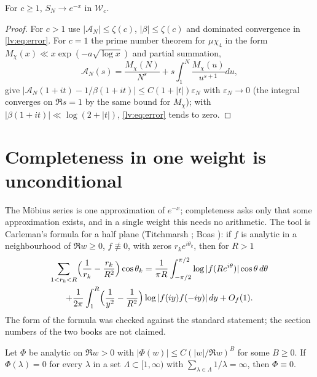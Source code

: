 \begin{theorem}\label{lv:thm:c1}
For $c\ge1$, $S_N\to e^{-x}$ in $\mathcal W_c$.
\end{theorem}

\begin{proof}
For $c>1$ use $|\mathcal A_N|\le\zeta(c)$, $|\beta|\le\zeta(c)$ and dominated convergence in \eqref{lv:eq:error}. For $c=1$ the prime number theorem for $\mu\chi_4$ in the form $M_\chi(x)\ll x\exp(-a\sqrt{\log x})$ and partial summation,
\begin{equation}\label{lv:eq:ps}
\mathcal A_N(s)=\frac{M_\chi(N)}{N^s}+s\int_1^N\frac{M_\chi(u)}{u^{s+1}}du,
\end{equation}
give $|\mathcal A_N(1+it)-1/\beta(1+it)|\le C(1+|t|)\varepsilon_N$ with $\varepsilon_N\to0$ (the integral converges on $\Re s=1$ by the same bound for $M_\chi$); with $|\beta(1+it)|\ll\log(2+|t|)$, \eqref{lv:eq:error} tends to zero.
\end{proof}

\section{Completeness in one weight is unconditional}\label{lv:sec:single}

The M\"obius series is one approximation of $e^{-x}$; completeness asks only that some approximation exists, and in a single weight this needs no arithmetic. The tool is Carleman's formula for a half plane (Titchmarsh \cite{Titchmarsh39}; Boas \cite{Boas54}): if $f$ is analytic in a neighbourhood of $\Re w\ge0$, $f\not\equiv0$, with zeros $r_ke^{i\theta_k}$, then for $R>1$
\begin{multline}\label{lv:eq:carleman}
\sum_{1<r_k<R}\Bigl(\frac1{r_k}-\frac{r_k}{R^2}\Bigr)\cos\theta_k=\frac1{\pi R}\int_{-\pi/2}^{\pi/2}\log|f(Re^{i\theta})|\cos\theta\,d\theta\\
+\frac1{2\pi}\int_1^R\Bigl(\frac1{y^2}-\frac1{R^2}\Bigr)\log|f(iy)f(-iy)|\,dy+O_f(1).
\end{multline}
The form of the formula was checked against the standard statement; the section numbers of the two books are not claimed.

\begin{lemma}\label{lv:lem:uniq}
Let $\Phi$ be analytic on $\Re w>0$ with $|\Phi(w)|\le C(|w|/\Re w)^B$ for some $B\ge0$. If $\Phi(\lambda)=0$ for every $\lambda$ in a set $\Lambda\subset[1,\infty)$ with $\sum_{\lambda\in\Lambda}1/\lambda=\infty$, then $\Phi\equiv0$.
\end{lemma}

